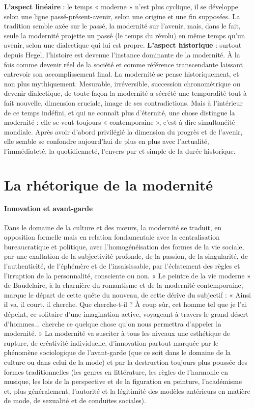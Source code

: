 \textbf{L'aspect linéaire} : le temps « moderne » n'est plus cyclique, il se développe selon une ligne passé-présent-avenir, selon une origine et une fin supposées. La tradition semble axée sur le passé, la modernité sur l'avenir, mais, dans le fait, seule la modernité projette un passé (le temps du révolu) en même temps qu'un avenir, selon une dialectique qui lui est propre.
\textbf{L'aspect historique} : surtout depuis Hegel, l'histoire est devenue l'instance dominante de la modernité. À la fois comme devenir réel de la société et comme référence transcendante laissant entrevoir son accomplissement final. La modernité se pense historiquement, et non plus mythiquement.
Mesurable, irréversible, succession chronométrique ou devenir dialectique, de toute façon la modernité a sécrété une temporalité tout à fait nouvelle, dimension cruciale, image de ses contradictions. Mais à l'intérieur de ce temps indéfini, et qui ne connaît plus d'éternité, une chose distingue la modernité : elle se veut toujours « contemporaine », c'est-à-dire simultanéité mondiale. Après avoir d'abord privilégié la dimension du progrès et de l'avenir, elle semble se confondre aujourd'hui de plus en plus avec l'actualité, l'immédiateté, la quotidienneté, l'envers pur et simple de la durée historique.

\section{La rhétorique de la modernité}

\paragraph{Innovation et avant-garde}

Dans le domaine de la culture et des mœurs, la modernité se traduit, en opposition formelle mais en relation fondamentale avec la centralisation bureaucratique et politique, avec l'homogénéisation des formes de la vie sociale, par une exaltation de la subjectivité profonde, de la passion, de la singularité, de l'authenticité, de l'éphémère et de l'insaisissable, par l'éclatement des règles et l'irruption de la personnalité, consciente ou non.
« Le peintre de la vie moderne » de Baudelaire, à la charnière du romantisme et de la modernité contemporaine, marque le départ de cette quête du nouveau, de cette dérive du subjectif : « Ainsi il va, il court, il cherche. Que cherche-t-il ? À coup sûr, cet homme tel que je l'ai dépeint, ce solitaire d'une imagination active, voyageant à travers le grand désert d'hommes... cherche ce quelque chose qu'on nous permettra d'appeler la modernité. »
La modernité va susciter à tous les niveaux une esthétique de rupture, de créativité individuelle, d'innovation partout marquée par le phénomène sociologique de l'avant-garde (que ce soit dans le domaine de la culture ou dans celui de la mode) et par la destruction toujours plus poussée des formes traditionnelles (les genres en littérature, les règles de l'harmonie en musique, les lois de la perspective et de la figuration en peinture, l'académisme et, plus généralement, l'autorité et la légitimité des modèles antérieurs en matière de mode, de sexualité et de conduites sociales).

